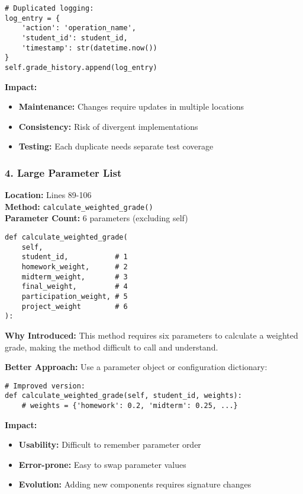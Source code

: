 \documentclass[11pt,a4paper]{article}
\begin{document}
\begin{lstlisting}[caption={Duplicated Logging Pattern}]
# Duplicated logging:
log_entry = {
    'action': 'operation_name',
    'student_id': student_id,
    'timestamp': str(datetime.now())
}
self.grade_history.append(log_entry)
\end{lstlisting}

\textbf{Impact:}
\begin{itemize}[noitemsep]
    \item \textbf{Maintenance:} Changes require updates in multiple locations
    \item \textbf{Consistency:} Risk of divergent implementations
    \item \textbf{Testing:} Each duplicate needs separate test coverage
\end{itemize}

\subsubsection{4. Large Parameter List}

\textbf{Location:} Lines 89-106 \\
\textbf{Method:} \texttt{calculate\_weighted\_grade()} \\
\textbf{Parameter Count:} 6 parameters (excluding self)

\begin{lstlisting}[caption={Large Parameter List Example}]
def calculate_weighted_grade(
    self, 
    student_id,           # 1
    homework_weight,      # 2
    midterm_weight,       # 3
    final_weight,         # 4
    participation_weight, # 5
    project_weight        # 6
):
\end{lstlisting}

\textbf{Why Introduced:} This method requires six parameters to calculate a weighted grade, making the method difficult to call and understand.

\textbf{Better Approach:} Use a parameter object or configuration dictionary:
\begin{lstlisting}[caption={Improved Design (not implemented)}]
# Improved version:
def calculate_weighted_grade(self, student_id, weights):
    # weights = {'homework': 0.2, 'midterm': 0.25, ...}
\end{lstlisting}

\textbf{Impact:}
\begin{itemize}[noitemsep]
    \item \textbf{Usability:} Difficult to remember parameter order
    \item \textbf{Error-prone:} Easy to swap parameter values
    \item \textbf{Evolution:} Adding new components requires signature changes
\end{itemize}
\end{document}
